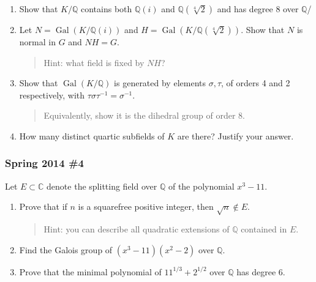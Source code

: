 \begin{enumerate}
\def\labelenumi{\alph{enumi}.}
\item
  Show that \(K/{\mathbb{Q}}\) contains both \({\mathbb{Q}}(i)\) and
  \({\mathbb{Q}}(\sqrt[4]{2})\) and has degree 8 over \({\mathbb{Q}}\)/
\item
  Let \(N = { \operatorname{Gal}} (K/{\mathbb{Q}}(i))\) and
  \(H = { \operatorname{Gal}} (K/{\mathbb{Q}}(\sqrt[4]{2}))\). Show that
  \(N\) is normal in \(G\) and \(NH = G\).

  \begin{quote}
  Hint: what field is fixed by \(NH\)?
  \end{quote}
\item
  Show that \({ \operatorname{Gal}} (K/{\mathbb{Q}})\) is generated by
  elements \(\sigma, \tau\), of orders 4 and 2 respectively, with
  \(\tau \sigma\tau^{-1}= \sigma^{-1}\).

  \begin{quote}
  Equivalently, show it is the dihedral group of order 8.
  \end{quote}
\item
  How many distinct quartic subfields of \(K\) are there? Justify your
  answer.
\end{enumerate}

\hypertarget{spring-2014-4}{%
\subsubsection{Spring 2014 \#4}\label{spring-2014-4}}

Let \(E\subset {\mathbb{C}}\) denote the splitting field over
\({\mathbb{Q}}\) of the polynomial \(x^3 - 11\).

\begin{enumerate}
\def\labelenumi{\alph{enumi}.}
\item
  Prove that if \(n\) is a squarefree positive integer, then
  \(\sqrt{n}\not\in E\).

  \begin{quote}
  Hint: you can describe all quadratic extensions of \({\mathbb{Q}}\)
  contained in \(E\).
  \end{quote}
\item
  Find the Galois group of \((x^3 - 11)(x^2 - 2)\) over
  \({\mathbb{Q}}\).
\item
  Prove that the minimal polynomial of \(11^{1/3} + 2^{1/2}\) over
  \({\mathbb{Q}}\) has degree 6.
\end{enumerate}

